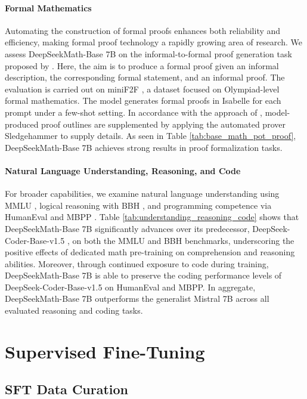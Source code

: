 \paragraph{Formal Mathematics}

Automating the construction of formal proofs enhances both reliability and efficiency, making formal proof technology a rapidly growing area of research. We assess DeepSeekMath-Base 7B on the informal-to-formal proof generation task proposed by \citep{dsp_proof}. Here, the aim is to produce a formal proof given an informal description, the corresponding formal statement, and an informal proof. The evaluation is carried out on miniF2F \citep{minif2f}, a dataset focused on Olympiad-level formal mathematics. The model generates formal proofs in Isabelle for each prompt under a few-shot setting. In accordance with the approach of \cite{dsp_proof}, model-produced proof outlines are supplemented by applying the automated prover Sledgehammer \citep{sledgehammer} to supply details. As seen in Table \ref{tab:base_math_pot_proof}, DeepSeekMath-Base 7B achieves strong results in proof formalization tasks.

\paragraph{Natural Language Understanding, Reasoning, and Code}

For broader capabilities, we examine natural language understanding using MMLU \citep{mmlu}, logical reasoning with BBH \citep{bbh}, and programming competence via HumanEval \citep{codex} and MBPP \citep{mbpp}. Table \ref{tab:understanding_reasoning_code} shows that DeepSeekMath-Base 7B significantly advances over its predecessor, DeepSeek-Coder-Base-v1.5 \citep{deepseek-coder}, on both the MMLU and BBH benchmarks, underscoring the positive effects of dedicated math pre-training on comprehension and reasoning abilities. Moreover, through continued exposure to code during training, DeepSeekMath-Base 7B is able to preserve the coding performance levels of DeepSeek-Coder-Base-v1.5 on HumanEval and MBPP. In aggregate, DeepSeekMath-Base 7B outperforms the generalist Mistral 7B \citep{mistral} across all evaluated reasoning and coding tasks.

\section{Supervised Fine-Tuning}

\subsection{SFT Data Curation}

